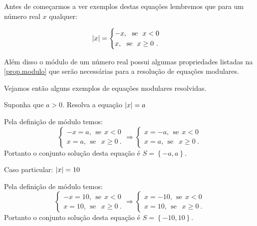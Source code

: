  Antes de começarmos a ver exemplos destas equações lembremos que para um número real $x$ qualquer:

 \[
\left|x\right|= \begin{cases}
      -x, \ \ \text{se} \ \ x<0 \\
      x, \ \ \text{se} \ \ x \geq 0 \ .
     \end{cases}
\]

Além disso o módulo de um número real possui algumas propriedades listadas na \autoref{prop.modulo} que serão necessárias para a resolução de equações modulares.

Vejamos então alguns exemplos de equações modulares resolvidas.

\begin{exem} 
  Suponha que $a> 0$. Resolva a equação $\left|x\right|= a$

  Pela definição de módulo temos:
  \[
  \begin{cases}
      -x= a, \ \ \text{se} \ \ x<0 \\
      x= a, \ \ \text{se } \ \ x \geq 0 \ .
     \end{cases}
     \Rightarrow
     \begin{cases}
      x= -a, \ \ \text{se} \ \ x<0 \\
      x= a, \ \ \text{se } \ \ x \geq 0 \ .
     \end{cases}
  \]
 Portanto o conjunto solução desta equação é $S= \left\{-a, a \right\}$.
\end{exem}

\begin{exem}
  Caso particular: $\left|x\right|= 10$

  Pela definição de módulo temos:
  \[
  \begin{cases}
      -x= 10, \ \ \text{se} \ \ x<0 \\
      x= 10, \ \ \text{se } \ \ x \geq 0 \ .
     \end{cases}
     \Rightarrow
     \begin{cases}
      x= -10, \ \ \text{se} \ \ x<0 \\
      x= 10, \ \ \text{se } \ \ x \geq 0 \ .
     \end{cases}
  \]
 Portanto o conjunto solução desta equação é $S= \left\{-10, 10 \right\}$.
\end{exem}

